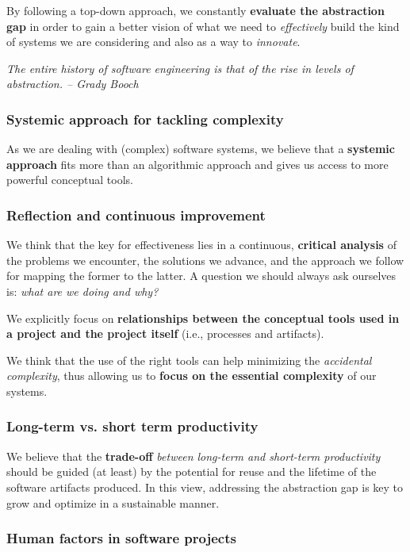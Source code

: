 \documentclass[11pt]{article}
\newcommand{\myquote}[1]{
\setlength{\leftskip}{3cm}

\noindent \emph{#1}

\setlength{\leftskip}{0pt}
}
\begin{document}
By following a top-down approach, we constantly \textbf{evaluate
the abstraction gap} in order to gain a better vision of what we need to
\emph{effectively} build the kind of systems we are considering and also as a
way to \emph{innovate}.

\myquote{The entire history of software engineering is that of the rise
in levels of abstraction. -- Grady Booch}

\subsubsection*{Systemic approach for tackling complexity}

As we are dealing with (complex) software systems, we believe
that a \textbf{systemic approach} fits more than an algorithmic approach and 
gives us access to more powerful conceptual tools.


\subsubsection*{Reflection and continuous improvement}

We think that the key for effectiveness lies in a continuous, \textbf{critical
analysis} of the problems we encounter, the solutions we advance, and the
approach we follow for mapping the former to the latter. A question we should
always ask ourselves is: \emph{what are we doing and why?}

We explicitly focus on \textbf{relationships between the conceptual tools used
in a project and the project itself} (i.e., processes and artifacts).

We think that the use of the right tools can help minimizing
 the \emph{accidental complexity}, thus allowing us to \textbf{focus on the
 essential complexity} of our systems. 
 
 
\subsubsection*{Long-term vs. short term productivity} 
 
 We believe that the \textbf{trade-off}  \emph{between
 long-term and short-term productivity} should be guided (at least) by the potential for
 reuse and the lifetime of the software artifacts produced. In this view,
 addressing the abstraction gap is key to grow and optimize in a sustainable
 manner.

\subsubsection*{Human factors in software projects}
\end{document}
